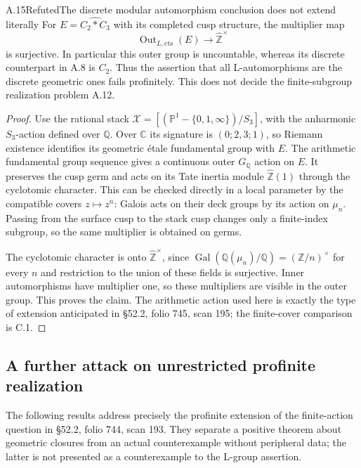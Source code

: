 \begin{statement}{A.15}{Refuted}{The discrete modular automorphism conclusion does not extend literally}
For $E=\widehat{C_2*C_3}$ with its completed cusp structure,
the multiplier map
\[
 \operatorname{Out}_{L,\mathrm{cts}}(E)
       \longrightarrow\widehat{\mathbb Z}^{\times}
\]
is surjective. In particular this outer group is uncountable,
whereas its discrete counterpart in A.8 is $C_2$.
Thus the assertion that all L-automorphisms are the discrete
geometric ones fails profinitely. This does not decide the
finite-subgroup realization problem A.12.
\end{statement}
\begin{proof}
Use the rational stack
$\mathcal X=[(\mathbb P^1-\{0,1,\infty\})/S_3]$, with
the anharmonic $S_3$-action defined over $\mathbb Q$.
Over $\mathbb C$ its signature is $(0;2,3;1)$, so
Riemann existence identifies its geometric \'etale
fundamental group with $E$. The arithmetic fundamental
group sequence gives a continuous outer $G_{\mathbb Q}$
action on $E$. It preserves the cusp germ and acts on
its Tate inertia module $\widehat{\mathbb Z}(1)$ through
the cyclotomic character. This can be checked directly
in a local parameter by the compatible covers
$z\mapsto z^n$: Galois acts on their deck groups by its
action on $\mu_n$. Passing from the surface cusp to the
stack cusp changes only a finite-index subgroup, so
the same multiplier is obtained on germs.

The cyclotomic character is onto
$\widehat{\mathbb Z}^{\times}$, since
$\operatorname{Gal}(\mathbb Q(\mu_n)/\mathbb Q)
 =(\mathbb Z/n)^{\times}$ for every $n$ and restriction
to the union of these fields is surjective. Inner
automorphisms have multiplier one, so these multipliers
are visible in the outer group. This proves the claim.
The arithmetic action used here is exactly the type of
extension anticipated in \S52.2, folio 745, scan 195;
the finite-cover comparison is C.1.
\end{proof}

\subsection{A further attack on unrestricted profinite realization}

The following results address precisely the profinite extension of
the finite-action question in \S52.2, folio 744, scan 193. They
separate a positive theorem about geometric closures from an actual
counterexample without peripheral data; the latter is not presented
as a counterexample to the L-group assertion.

